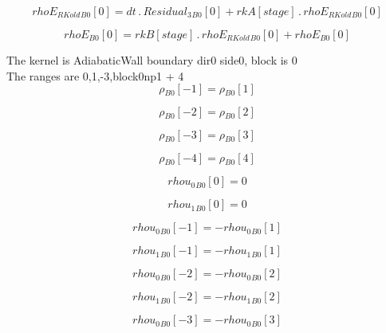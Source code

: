 \documentclass{article}
\begin{document}
\begin{dmath}{rhoE_{RKold}{_{B0}}}[{0}] = dt \,.\, {Residual_{3}{_{B0}}}[{0}] + {rkA}[{stage}] \,.\, {rhoE_{RKold}{_{B0}}}[{0}]\end{dmath}

\begin{dmath}{rhoE{_{B0}}}[{0}] = {rkB}[{stage}] \,.\, {rhoE_{RKold}{_{B0}}}[{0}] + {rhoE{_{B0}}}[{0}]\end{dmath}

\noindent The kernel is AdiabaticWall boundary dir0 side0, block is 0\\\noindent The ranges are 0,1,-3,block0np1 + 4\\\begin{dmath}{\rho{_{B0}}}[{-1}] = {\rho{_{B0}}}[{1}]\end{dmath}

\begin{dmath}{\rho{_{B0}}}[{-2}] = {\rho{_{B0}}}[{2}]\end{dmath}

\begin{dmath}{\rho{_{B0}}}[{-3}] = {\rho{_{B0}}}[{3}]\end{dmath}

\begin{dmath}{\rho{_{B0}}}[{-4}] = {\rho{_{B0}}}[{4}]\end{dmath}

\begin{dmath}{rhou_{0}{_{B0}}}[{0}] = 0\end{dmath}

\begin{dmath}{rhou_{1}{_{B0}}}[{0}] = 0\end{dmath}

\begin{dmath}{rhou_{0}{_{B0}}}[{-1}] = - {rhou_{0}{_{B0}}}[{1}]\end{dmath}

\begin{dmath}{rhou_{1}{_{B0}}}[{-1}] = - {rhou_{1}{_{B0}}}[{1}]\end{dmath}

\begin{dmath}{rhou_{0}{_{B0}}}[{-2}] = - {rhou_{0}{_{B0}}}[{2}]\end{dmath}

\begin{dmath}{rhou_{1}{_{B0}}}[{-2}] = - {rhou_{1}{_{B0}}}[{2}]\end{dmath}

\begin{dmath}{rhou_{0}{_{B0}}}[{-3}] = - {rhou_{0}{_{B0}}}[{3}]\end{dmath}
\end{document}
